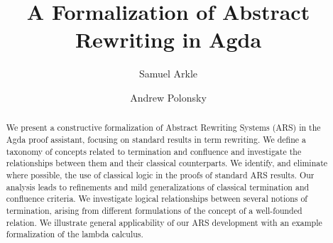 \documentclass[a4paper,UKenglish]{lipics-v2021}
\title{A Formalization of Abstract Rewriting in Agda}
\author{Samuel Arkle}{Appalachian State University, USA}{arklesd@appstate.edu}{}{}
\author{Andrew Polonsky}{Appalachian State University, USA}{polonskya@appstate.edu}{}{}
\begin{document}
\maketitle
\begin{abstract}
    We present a constructive formalization of Abstract Rewriting Systems (ARS)
    in the Agda proof assistant, focusing on standard results in term rewriting. We define a taxonomy of
concepts related to termination and confluence and investigate the
relationships between them and their classical counterparts. We identify,
and eliminate where possible, the use of classical logic in the proofs of
standard ARS results. Our analysis leads to refinements and mild
generalizations of classical termination and confluence criteria. We
investigate logical relationships between several notions of termination,
arising from different formulations of the concept of a well-founded relation. 
We illustrate general applicability of our ARS development with an example formalization of the lambda calculus. 
\end{abstract}



 




\newpage 






    
    
\end{document}
